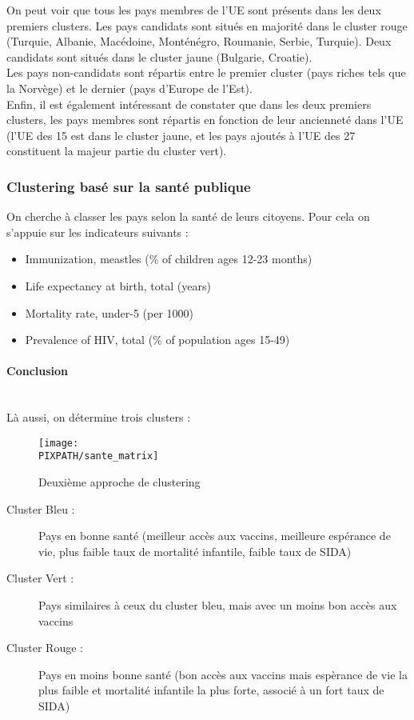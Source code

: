 \vskip 6pt

On peut voir que tous les pays membres de l'UE sont présents dans les deux
premiers clusters. Les pays candidats sont situés en majorité dans le cluster rouge
(Turquie, Albanie, Macédoine, Monténégro, Roumanie, Serbie, Turquie). Deux candidats
sont situés dans le cluster jaune (Bulgarie, Croatie).\\
Les pays non-candidats sont répartis entre le premier cluster (pays riches tels que la Norvège)
et le dernier (pays d'Europe de l'Est).\\
Enfin, il est également intéressant de constater que dans les deux premiers clusters,
les pays membres sont répartis en fonction de leur ancienneté dans l'UE (l'UE des 15
est dans le cluster jaune, et les pays ajoutés à l'UE des 27 constituent la majeur
partie du cluster vert).


\subsubsection{Clustering basé sur la santé publique}

On cherche à classer les pays selon la santé de leurs citoyens. Pour cela
on s'appuie sur les indicateurs suivants :

\begin{itemize}
\item Immunization, meastles (\% of children ages 12-23 months)
\item Life expectancy at birth, total (years)
\item Mortality rate, under-5 (per 1000)
\item Prevalence of HIV, total (\% of population ages 15-49)
\end{itemize}

\paragraph{Conclusion}\hfill\\

Là aussi, on détermine trois clusters :

\begin{sidewaysfigure}[h]
\centering
\caption{Deuxième approche de clustering}
\texttt{[image: \\PIXPATH/sante\_matrix]}
\end{sidewaysfigure}

\begin{description}
\item[Cluster Bleu : ] Pays en bonne santé (meilleur accès aux vaccins, meilleure espérance de vie, plus faible taux de mortalité infantile, faible taux de SIDA)
\item[Cluster Vert : ] Pays similaires à ceux du cluster bleu, mais avec un moins bon accès aux vaccins
\item[Cluster Rouge : ] Pays en moins bonne santé (bon accès aux vaccins mais espèrance de vie la plus faible et mortalité infantile la plus forte, associé à un fort taux de SIDA)
\end{description}

